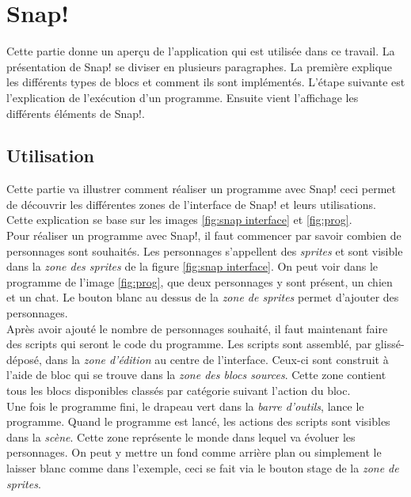 \section{Snap!}
Cette partie donne un aperçu de l'application qui est utilisée dans ce travail. La présentation de Snap! \cite{snap} se diviser en plusieurs paragraphes. La première explique les différents types de blocs et comment ils sont implémentés. L'étape suivante est l'explication de l'exécution d'un programme. Ensuite vient l'affichage les différents éléments de Snap!. %

\subsection{Utilisation}
Cette partie va illustrer comment réaliser un programme avec Snap! ceci permet de découvrir les différentes zones de l'interface de Snap! et leurs utilisations. Cette explication se base sur les images \ref{fig:snap interface} et \ref{fig:prog}.\\

Pour réaliser un programme avec Snap!, il faut commencer par savoir combien de personnages sont souhaités. Les personnages s'appellent des \textit{sprites} et sont visible dans la \textit{zone des sprites} de la figure \ref{fig:snap interface}. On peut voir dans le programme de l'image \ref{fig:prog}, que deux personnages y sont présent, un chien et un chat. Le bouton blanc au dessus de la \textit{zone de sprites} permet d'ajouter des personnages.\\

Après avoir ajouté le nombre de personnages souhaité, il faut maintenant faire des scripts qui seront le code du programme. Les scripts sont assemblé, par glissé-déposé, dans la \textit{zone d'édition} au centre de l'interface. Ceux-ci sont construit à l'aide de bloc qui se trouve dans la \textit{zone des blocs sources}. Cette zone contient tous les blocs disponibles classés par catégorie suivant l'action du bloc.\\

Une fois le programme fini, le drapeau vert dans la \textit{barre d'outils}, lance le programme. Quand le programme est lancé, les actions des scripts sont visibles dans la \textit{scène}. Cette zone représente le monde dans lequel va évoluer les personnages. On peut y mettre un fond comme arrière plan ou simplement le laisser blanc comme dans l'exemple, ceci se fait via le bouton stage de la \textit{zone de sprites}.
